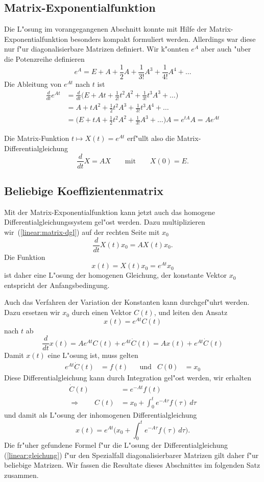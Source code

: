 \subsection{Matrix-Exponentialfunktion}
%
Die L"osung im vorangegangenen Abschnitt konnte mit Hilfe der
Matrix-Exponentialfunktion besonders kompakt formuliert werden.
Allerdings war diese nur f"ur diagonalisierbare Matrizen definiert.
Wir k"onnten $e^A$ aber auch "uber die Potenzreihe definieren
\[
e^A=E+A+\frac12A+\frac1{3!}A^3+\frac1{4!} A^4+\dots
\]
Die Ableitung von $e^{At}$ nach $t$ ist
\begin{align*}
\frac{d}{dt}e^{At}
&=
\frac{d}{dt}\biggl(E+At+\frac1{2!}t^2A^2+\frac1{3!}t^3A^3+\dots\Biggr)
\\
&=
A+tA^2+\frac12t^2A^3+\frac1{3!}t^3A^4+\dots
\\
&=
\biggl(E+tA+\frac12t^2A^2+\frac1{3!}A^3+\dots\biggr)A
=e^{tA}A=Ae^{At}
\end{align*}
\begin{satz}
\label{linear:matrix-exp}
Die Matrix-Funktion $t\mapsto X(t)=e^{At}$ erf"ullt also die
Matrix-Differentialgleichung
\begin{equation}
\frac{d}{dt} X = AX
\qquad\text{mit}\qquad
X(0)=E.
\label{linear:matrix-dgl}
\end{equation}
\end{satz}

\subsection{Beliebige Koeffizientenmatrix}
Mit der Matrix-Exponentialfunktion kann jetzt auch das homogene
Differentialgleichungssystem gel"ost werden.
Dazu multiplizieren wir~(\ref{linear:matrix-dgl}) auf der rechten Seite
mit $x_0$ 
\[
\frac{d}{dt}X(t)x_0 = A X(t)x_0.
\]
Die Funktion
\[
x(t)=X(t)x_0 = e^{At}x_0
\]
ist daher eine L"osung der homogenen Gleichung, der konstante Vektor $x_0$ 
entspricht der Anfangsbedingung.

Auch das Verfahren der Variation der Konstanten kann durchgef"uhrt werden.
%
Dazu ersetzen wir $x_0$ durch einen Vektor $C(t)$, und leiten den Ansatz
\[
x(t)=e^{At}C(t)
\]
nach $t$ ab
\[
\frac{d}{dt}x(t)
=
Ae^{At}C(t) + e^{At}\dot{C}(t)
=
A x(t) + e^{At}\dot{C}(t)
\]
Damit $x(t)$ eine L"osung ist, muss gelten
\[
\begin{aligned}
e^{At}\dot{C}(t)
&=
f(t)
&&\text{und}
&
C(0)&=x_0
\end{aligned}
\]
Diese Differentialgleichung kann durch Integration gel"ost werden,
wir erhalten
\begin{align*}
\dot{C}(t)
&=
e^{-At}f(t)
\\
\Rightarrow\qquad
C(t)
&=
x_0+\int_0^t e^{-A\tau}f(\tau)\,d\tau
\end{align*}
und damit als L"osung der inhomogenen Differentialgleichung
\[
x(t)
=
e^{At}\biggl(
x_0+\int_0^t e^{-A\tau}f(\tau)\,d\tau
\biggr).
\]
Die fr"uher gefundene Formel f"ur die L"osung der Differentialgleichung
(\ref{linear:gleichung}) f"ur den Spezialfall diagonalisierbarer 
Matrizen gilt daher f"ur beliebige Matrizen.
Wir fassen die Resultate dieses Abschnittes im folgenden Satz 
zusammen.

